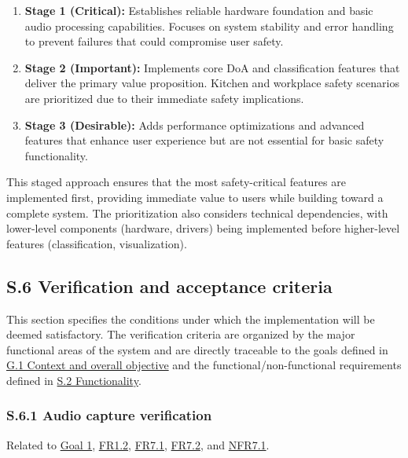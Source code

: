 \documentclass[12pt]{article}
\theoremstyle{definition}
\begin{document}
\begin{enumerate}
    \item \textbf{Stage 1 (Critical):} Establishes reliable hardware foundation
    and basic audio processing capabilities. Focuses on system stability and
    error handling to prevent failures that could compromise user safety.
    
    \item \textbf{Stage 2 (Important):} Implements core DoA and classification
    features that deliver the primary value proposition. Kitchen and workplace
    safety scenarios are prioritized due to their immediate safety implications.
    
    \item \textbf{Stage 3 (Desirable):} Adds performance optimizations and
    advanced features that enhance user experience but are not essential for
    basic safety functionality.
\end{enumerate}

This staged approach ensures that the most safety-critical features are
implemented first, providing immediate value to users while building toward a
complete system. The prioritization also considers technical dependencies, with
lower-level components (hardware, drivers) being implemented before higher-level
features (classification, visualization).

\subsection{S.6 Verification and acceptance criteria}

This section specifies the conditions under which the implementation will be
deemed satisfactory. The verification criteria are organized by the major
functional areas of the system and are directly traceable to the goals defined
in \hyperref[sec:G.1]{G.1 Context and overall objective} and the
functional/non-functional requirements defined in 
\hyperref[sec:S.2]{S.2 Functionality}.

\subsubsection{S.6.1 Audio capture verification}

Related to \hyperref[goal:audio_capture]{Goal 1}, \hyperref[FR1_2]{FR1.2},
\hyperref[FR7_1]{FR7.1}, \hyperref[FR7_2]{FR7.2}, and \hyperref[NFR7_1]{NFR7.1}.
\end{document}
